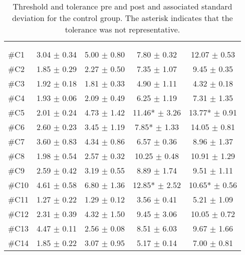 \begin{longtable} {l|c|c|c|c}
\caption{Threshold and tolerance pre and post and associated standard deviation for the control group. The asterisk indicates that the tolerance was not representative.}
	\label{tab:ControlA} \\
\cellcolor[HTML]{C0C0C0} {} & 
\multicolumn{2}{c|}{ \cellcolor[HTML]{C0C0C0}{\textbf{Threshold}}} & \multicolumn{2}{c}{ \cellcolor[HTML]{C0C0C0}{\textbf{Tolerance}}}  	\\  \rule{0pt}{3ex} 
  \cellcolor[HTML]{C0C0C0}{} &
 \multicolumn{1}{c|}{ \cellcolor[HTML]{C0C0C0}{Pre [KgF]}} & \multicolumn{1}{c|}{ \cellcolor[HTML]{C0C0C0}{Post [KgF]}} 
 & \multicolumn{1}{|c|}{ \cellcolor[HTML]{C0C0C0}{Pre [KgF]}} 
 & \multicolumn{1}{c|}{ \cellcolor[HTML]{C0C0C0}{Post [KgF]}} 	\\ \hline  
\#C1 & 3.04 $\pm$ 0.34	& 5.00 $\pm$ 0.80	& 7.80 $\pm$	 0.32 & 12.07 $\pm$ 0.53 \\ \hline
\#C2 & 1.85 $\pm$ 0.29 	& 2.27 $\pm$ 0.50	& 7.35 $\pm$ 1.07	& 9.45 $\pm$ 0.35	\\ \hline
\#C3 & 1.92 $\pm$ 0.18 & 1.81 $\pm$ 0.33	& 4.90 $\pm$ 1.11 	& 	4.32 $\pm$ 0.18	\\ \hline
\#C4 & 1.93 $\pm$ 0.06	& 2.09 $\pm$ 0.49	& 6.25 $\pm$ 1.19	&7.31 $\pm$ 	1.35 \\ \hline
\#C5 & 2.01 $\pm$ 0.24	& 4.73  $\pm$ 1.42 	& 11.46* $\pm$ 3.26 	& 13.77* $\pm$ 0.91	\\ \hline
\#C6 & 2.60 $\pm$ 0.23 	& 3.45 $\pm$ 1.19	& 7.85* $\pm$ 1.33	& 14.05 $\pm$ 0.81	\\ \hline	
\#C7 & 3.60 $\pm$ 0.83  & 4.34 $\pm$	0.86 	& 6.57 $\pm$ 0.36 & 8.96 $\pm$ 1.37 \\ \hline
\#C8 & 1.98 $\pm$ 0.54 & 2.57 $\pm$ 0.32 	& 10.25 $\pm$ 0.48	& 10.91 $\pm$  1.29 \\ \hline
\#C9 & 2.59 $\pm$ 0.42 & 3.19 $\pm$ 0.55 & 8.89 $\pm$ 1.74	& 9.51 $\pm$  1.11\\ \hline
\#C10 & 4.61 $\pm$ 0.58 & 6.80 $\pm$ 1.36 & 12.85* $\pm$ 2.52 	& 10.65*  $\pm$ 0.56 \\ \hline
\#C11 & 1.27 $\pm$ 0.22 & 1.29 	$\pm$ 0.12 	& 3.56 $\pm$ 0.41 & 5.21 $\pm$ 1.09 \\ \hline
\#C12 & 2.31 $\pm$ 0.39 & 4.32 $\pm$ 1.50	& 9.45 $\pm$ 3.06 & 10.05 $\pm$ 0.72 \\ \hline
\#C13 & 4.47 $\pm$ 0.11 & 2.56 $\pm$	0.08 & 8.51 $\pm$ 6.03 & 9.67 $\pm$  1.66\\ \hline
\#C14 & 1.85 $\pm$ 0.22 & 3.07 $\pm$ 0.95	 & 5.17 $\pm$ 0.14  & 7.00 $\pm$ 0.81 \\ \hline

\end{longtable}
